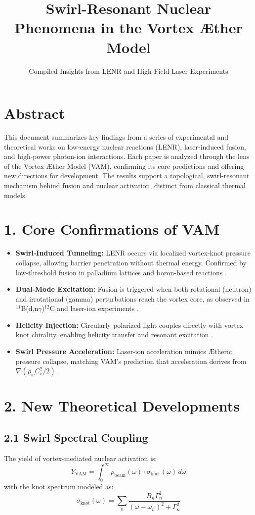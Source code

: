 \documentclass{article}
\title{Swirl-Resonant Nuclear Phenomena in the Vortex \AE ther Model}
\author{Compiled Insights from LENR and High-Field Laser Experiments}
\date{}
\begin{document}
\maketitle

\section*{Abstract}
This document summarizes key findings from a series of experimental and theoretical works on low-energy nuclear reactions (LENR), laser-induced fusion, and high-power photon-ion interactions. Each paper is analyzed through the lens of the Vortex \AE ther Model (VAM), confirming its core predictions and offering new directions for development. The results support a topological, swirl-resonant mechanism behind fusion and nuclear activation, distinct from classical thermal models.

\section*{1. Core Confirmations of VAM}
\begin{itemize}
  \item \textbf{Swirl-Induced Tunneling:} LENR occurs via localized vortex-knot pressure collapse, allowing barrier penetration without thermal energy. Confirmed by low-threshold fusion in palladium lattices and boron-based reactions \cite{sinha2008laser, labaune2013fusion}.
  \item \textbf{Dual-Mode Excitation:} Fusion is triggered when both rotational (neutron) and irrotational (gamma) perturbations reach the vortex core, as observed in $^{11}$B(d,n$\gamma$)$^{12}$C and laser-ion experiments \cite{gold2023uncovering, labaune2013fusion}.
  \item \textbf{Helicity Injection:} Circularly polarized light couples directly with vortex knot chirality, enabling helicity transfer and resonant excitation \cite{zamfir2021eli}.
  \item \textbf{Swirl Pressure Acceleration:} Laser-ion acceleration mimics \AE theric pressure collapse, matching VAM's prediction that acceleration derives from $\nabla(\rho_{\text{\ae}} C_e^2/2)$ \cite{bychenkov1999laser, zamfir2021eli}.
\end{itemize}

\section*{2. New Theoretical Developments}
\subsection*{2.1 Swirl Spectral Coupling}
The yield of vortex-mediated nuclear activation is:
\[
Y_{\mathrm{VAM}} = \int_0^\infty \rho_{\mathrm{beam}}(\omega) \cdot \sigma_{\mathrm{knot}}(\omega) \, d\omega
\]
with the knot spectrum modeled as:
\[
\sigma_{\mathrm{knot}}(\omega) = \sum_n \frac{B_n \Gamma_n^2}{(\omega - \omega_n)^2 + \Gamma_n^2}
\]
\end{document}
